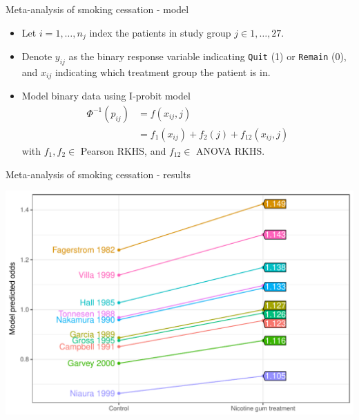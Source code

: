 \documentclass{beamer}\usepackage[]{graphicx}\usepackage[]{color}
\makeatletter
\def\maxwidth{ %
  \ifdim\Gin@nat@width>\linewidth
    \linewidth
  \else
    \Gin@nat@width
  \fi
}
\newenvironment{knitrout}{}{} %
\makeatother
\begin{document}
\begin{frame}[fragile]{Meta-analysis of smoking cessation - model}
  \begin{itemize}
    \item Let $i = 1,\dots,n_j$ index the patients in study group $j \in 1,\dots,27$.
    \item Denote $y_{ij}$ as the binary response variable indicating \texttt{Quit} (1) or \texttt{Remain} (0), and $x_{ij}$ indicating which treatment group the patient is in.
    \item Model binary data using I-probit model
    \begin{align*}
      \Phi^{-1}(p_{ij}) &= f(x_{ij}, j) \\
      &= f_1(x_{ij}) + f_2(j) + f_{12}(x_{ij}, j)
    \end{align*}
    with $f_1, f_2 \in$ Pearson RKHS, and $f_{12} \in$ ANOVA RKHS.
  \end{itemize}
\end{frame}



\begin{frame}[fragile]{Meta-analysis of smoking cessation - results}
\vspace{-3pt}
\begin{knitrout}\small
{}\color{fgcolor}

{\centering \includegraphics[width=\maxwidth]{figure/plot_smoke-1} 

}



\end{knitrout}
\end{frame}
\end{document}
